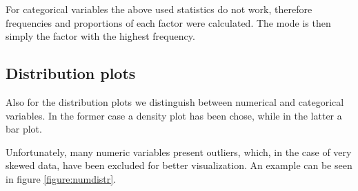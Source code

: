 For categorical variables the above used statistics do not work, therefore frequencies and proportions of each factor were calculated. The mode is then simply the factor with the highest frequency.




\subsection{Distribution plots}\label{subsec:distrplots}

Also for the distribution plots we distinguish between numerical and categorical variables. In the former case a density plot has been chose, while in the latter a bar plot.

Unfortunately, many numeric variables present outliers, which, in the case of very skewed data, have been excluded for better visualization. An example can be seen in figure \ref{figure:numdistr}.

